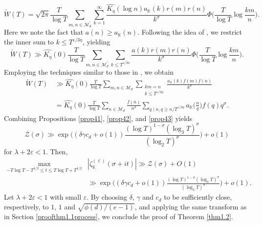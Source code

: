 \documentclass[12pt,reqno]{amsart}
\theoremstyle{definition}
\numberwithin{equation}{section}
\newcommand{\mbk}{\mathbb{K}}
\newcommand{\mcm}{\mathcal{M}}
\newcommand{\mcz}{\mathcal{Z}}
\begin{document}
$$
\widetilde{W}(T)= \sqrt{2 \pi} \frac{T}{\log T} \sum_{m,n \in \mcm^{\prime}_d} \sum_{k=1}^{\infty}\frac{\widehat{K_{\eta}}(\log n)a_\mbk(k)r(m)r(n)}{k^{\sigma}} \Phi\Big(\frac{T}{\log T} \log \frac{km}{n}\Big).
$$
Here we note the fact that $a(n) \ge a_\mbk(n)$. Following the idea of \cite{bondarenko2023dichotomy}, we restrict the inner sum to $k \le T^{\varepsilon/3\eta}$, yielding
$$
\widetilde{W}(T) \gg \widehat{K_{\eta}}(0) \frac{T}{\log T} \sum_{m,n\in\mathcal{M}^{\prime}_d} \sum_{k\le T^{\varepsilon/3n}} \frac{a(k)r(m)r(n)}{k^{\sigma}} \Phi\Big(\frac{T}{\log T} \log \frac{km}{n}\Big).
$$
Employing the techniques similar to those in \cite[Eq. (21)]{bondarenko2018argument}, we obtain
\begin{align}
\label{widetildeWTlowerbound}
\widetilde{W}(T)
&\, \gg \widehat{K_{\eta}}(0) \frac{T}{\log T}\sum_{m,n\in\mcm_d} \sum_{\substack{km = n \\k\le T^{\varepsilon/3\eta}}} \frac{a_\mbk(k)f(m)f(n)}{k^{\sigma}} \nonumber \\
&\, = \widehat{K_{\eta}}(0) \frac{T}{\log T} \sum_{n\in\mcm_d} \frac{f(n)}{n^{\sigma}} \sum_{q\mid n, q\ge n/T^{\varepsilon/3\eta}} a_\mbk\Big(\frac{n}{q}\Big)f(q)q^{\sigma}.
\end{align}
Combining Propositions \ref{prop41}, \ref{prop42}, and \ref{prop43} yields
$$\mcz(\sigma) \gg \exp\bigg((\delta\gamma c_d + o(1))\frac{(\log T  )^{1-\sigma}(\log_3 T)^{\sigma}}{(\log_2 T)^{\sigma}}\bigg) + o(1)$$
for $\lambda + 2\varepsilon <1.$ Then, 
\begin{align*}
    \max_{-T \log T - T^{1/2}\le t\le T \log T +T^{1/2}}&|\zeta_\mbk^{(\ell)}(\sigma+it)| \gg \mcz(\sigma) + O(1)\\
    &\gg \exp\bigg((\delta\gamma c_d + o(1))\frac{(\log T)^{1-\sigma} (\log_3 T)^{\sigma}}{(\log_2 T)^{\sigma}}\bigg) + o(1).
\end{align*}
Let $\lambda +2 \varepsilon <1$ with small $\varepsilon$. By choosing $\delta$, $\gamma$ and $c_d$ to be sufficiently close, respectively, to $1$, $1$ and $\sqrt{\phi(d)/(e-1)}$, and applying the same transform as in Section \ref{proofthm1.1process}, we conclude the proof of Theorem \ref{thm1.2}.
\end{document}
